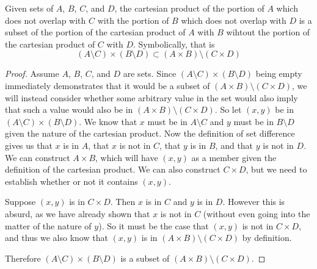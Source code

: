 \documentclass[main.tex]{subfiles}
\begin{document}
\begin{thm}
	Given sets of \(A\), \(B\), \(C\), and \(D\), the cartesian product of
	the portion of \(A\) which does not overlap with \(C\) with the portion
	of \(B\) which does not overlap with \(D\) is a subset of the portion of
	the cartesian product of \(A\) with \(B\) wihtout the portion of the
	cartesian product of \(C\) with \(D\). Symbolically, that is
	\[(A \setminus C) \times (B \setminus D) \subset (A \times B) \setminus (C \times D)\]
\end{thm}
\begin{proof}
	Assume \(A\), \(B\), \(C\), and \(D\) are sets. Since
	\((A \setminus C) \times (B \setminus D)\) being empty immediately
	demonstrates that it would be a subset of
	\((A \times B) \setminus (C \times D)\), we will instead consider
	whether some arbitrary value in the set would also imply that such a
	value would also be in \((A \times B) \setminus (C \times D)\). So let
	\((x,y)\) be in \((A \setminus C) \times (B \setminus D)\). We know that
	\(x\) must be in \(A \setminus C\) and \(y\) must be in
	\(B \setminus D\) given the nature of the cartesian product. Now the
	definition of set difference gives us that \(x\) is in \(A\), that \(x\)
	is not in \(C\), that \(y\) is in \(B\), and that \(y\) is not in \(D\).
	We can construct \(A \times B\), which will have \((x,y)\) as a member
	given the definition of the cartesian product. We can also construct
	\(C \times D\), but we need to establish whether or not it contains
	\((x,y)\).

	Suppose \((x,y)\) is in \(C \times D\). Then \(x\) is in \(C\) and \(y\)
	is in \(D\). However this is absurd, as we have already shown that \(x\)
	is not in \(C\) (without even going into the matter of the nature of
	\(y\)). So it must be the case that \((x,y)\) is not in \(C \times D\),
	and thus we also know that \((x,y)\) is in
	\((A \times B) \setminus (C \times D)\) by definition.

	Therefore \((A \setminus C) \times (B \setminus D)\) is a subset of
	\((A \times B) \setminus (C \times D)\).
\end{proof}
\end{document}
